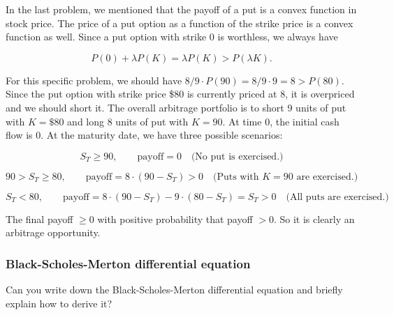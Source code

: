 

\begin{solution}
In the last problem, we mentioned that the payoff of a put is a convex function in
stock price. The price of a put option as a function of the strike price is a convex
function as well. Since a put option with strike 0 is worthless, we always have

\[
P(0)+\lambda P(K)=\lambda P(K)>P(\lambda K).
\]

For this specific problem, we should have $8/9\cdot P(90)=8/9\cdot9=8>P(80)$. Since the
put option with strike price \$80 is currently priced at 8, it is overpriced and we should
short it. The overall arbitrage portfolio is to short 9 units of put with $K=\$80$ and long
8 units of put with $K=90$. At time 0, the initial cash flow is 0. At the maturity date, we
have three possible scenarios:

\[
S_T\ge 90,\qquad \text{payoff}=0\quad\text{(No put is exercised.)}
\]

\[
90>S_T\ge 80,\qquad \text{payoff}=8\cdot(90-S_T)>0\quad\text{(Puts with }K=90\text{ are exercised.)}
\]

\[
S_T<80,\qquad \text{payoff}=8\cdot(90-S_T)-9\cdot(80-S_T)=S_T>0\quad\text{(All puts are exercised.)}
\]

The final payoff $\ge0$ with positive probability that payoff $>0$. So it is clearly an
arbitrage opportunity.

\end{solution}

\subsubsection*{Black-Scholes-Merton differential equation}

\begin{problem}{Can you write down the Black-Scholes-Merton differential equation and briefly explain
how to derive it?}
\end{problem}

